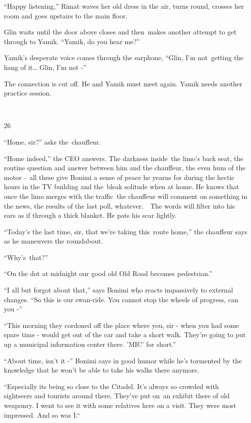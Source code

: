 \documentclass[twoside,11pt]{book}
\begin{document}
``Happy listening,'' Rimat waves her old dress in the air, turns round, crosses her room and
goes upstairs to the main floor.

Glin waits until the door above closes and then~makes another attempt to get through to Yamik. ``Yamik, do
you hear me?'' 

Yamik's desperate voice comes through the earphone, ``Glin, I'm not~getting the hang of it{\dots} Glin, I'm
not {}-''

The connection is cut off. He and Yamik must meet again. Yamik needs another practice session. 

~

26

``Home, sir?'' asks the~chauffeur. 

``Home indeed,'' the CEO answers. The darkness inside{\ }the limo's back seat,
the routine question and answer between him and the chauffeur, the even hum of the motor -- all these give Bonimi a
sense of peace he yearns for during the hectic hours in the TV building and the{\ }bleak solitude when
at home. He knows that once the limo merges with the traffic~the chauffeur will comment on something in the news, the
results of the last poll, whatever.\ \ The words will filter into his ears as if through a thick blanket. He pats his
scar lightly.

``Today's the last time, sir, that we're taking this\ route home,'' the chauffeur says as he
maneuvers the roundabout. 

``Why's\ that?'' 

``On the dot at midnight our good old Old Road becomes pedestrian.'' 

``I all but forgot about that,'' says Bonimi who reacts impassively to external changes.
``So this is our swan-ride. You cannot stop the wheels of progress, can you -{}'' 

``This morning they cordoned off the place where you, sir - when you had some spare time - would get out of
the car and take a short walk. They're going to put up a municipal information center there. 'MIC' for
short.'' 

``About time, isn't it -{}'' Bonimi says in good humor while he's tormented by the knowledge that he won't
be able to take his walks there anymore.\ {\ }

``Especially its being so close to the Citadel. It's always so crowded with sightseers and tourists around
there. They've put on~an exhibit there of old weaponry. I went to see it with some relatives here on a visit. They were
most impressed. And so was I.``\ 
\end{document}
